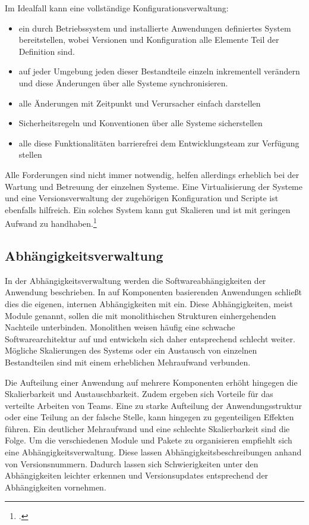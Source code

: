 Im Idealfall kann eine vollständige Konfigurationsverwaltung:
\begin{itemize}
\item ein durch Betriebssystem und installierte Anwendungen definiertes System bereitstellen, wobei Versionen und Konfiguration alle Elemente Teil der Definition sind.
\item auf jeder Umgebung jeden dieser Bestandteile einzeln inkrementell verändern und diese Änderungen über alle Systeme synchronisieren.
\item alle Änderungen mit Zeitpunkt und Verursacher einfach darstellen
\item Sicherheitsregeln und Konventionen über alle Systeme sicherstellen
\item alle diese Funktionalitäten barrierefrei dem Entwicklungsteam zur Verfügung stellen
\end{itemize}

Alle Forderungen sind nicht immer notwendig, helfen allerdings erheblich bei der Wartung und Betreuung der einzelnen Systeme. 
Eine Virtualisierung der Systeme und eine Versionsverwaltung der zugehörigen Konfiguration und Scripte ist ebenfalls 
hilfreich. Ein solches System kann gut Skalieren und ist mit geringen Aufwand zu handhaben.\footcite{humble2010}

\subsection{Abhängigkeitsverwaltung}

In der Abhängigkeitsverwaltung werden die Softwareabhängigkeiten der Anwendung beschrieben. In auf  Komponenten 
basierenden Anwendungen schließt dies die eigenen, internen Abhängigkeiten mit ein. Diese Abhängigkeiten, meist Module 
genannt, sollen die mit monolithischen Strukturen einhergehenden Nachteile unterbinden. Monolithen weisen häufig eine 
schwache Softwarearchitektur auf und entwickeln sich daher entsprechend schlecht weiter. Mögliche Skalierungen des 
Systems oder ein Austausch von einzelnen Bestandteilen sind mit einem erheblichen Mehraufwand verbunden.

Die Aufteilung einer Anwendung auf mehrere Komponenten erhöht hingegen die Skalierbarkeit und Austauschbarkeit. Zudem 
ergeben sich Vorteile für das verteilte Arbeiten von Teams. 
Eine zu starke Aufteilung der Anwendungsstruktur oder eine Teilung an der falsche Stelle, kann hingegen zu gegenteiligen 
Effekten führen. Ein deutlicher Mehraufwand und eine schlechte Skalierbarkeit sind die Folge. Um die verschiedenen Module 
und Pakete zu organisieren empfiehlt sich eine Abhängigkeitsverwaltung. Diese lassen Abhängigkeitsbeschreibungen anhand 
von Versionsnummern. Dadurch lassen sich Schwierigkeiten unter den Abhängigkeiten leichter erkennen und Versionsupdates 
entsprechend der Abhängigkeiten vornehmen.

